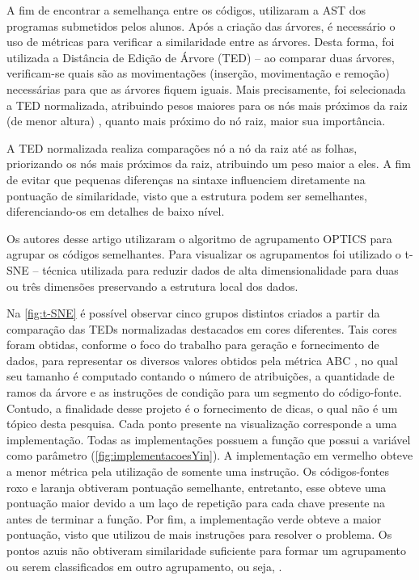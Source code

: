 		A fim de encontrar a semelhança entre os códigos, 
		utilizaram a AST dos programas submetidos pelos alunos. Após a criação das
		árvores, é necessário o uso de métricas para verificar a similaridade entre
		as árvores. Desta forma, foi utilizada a Distância de Edição de Árvore (\ac{TED})
		– ao comparar duas árvores, verificam-se quais são as movimentações (inserção,
		movimentação e remoção) necessárias para que as árvores fiquem iguais. Mais
		precisamente, foi selecionada a \acs{TED} normalizada, atribuindo pesos maiores para
		os nós mais próximos da raiz (de menor altura) \cite{zhang1989simple}, quanto
		mais próximo do nó raiz, maior sua importância.

		A \acs{TED} normalizada realiza comparações nó a nó da raiz até as folhas, priorizando
		os nós mais próximos da raiz, atribuindo um peso maior a eles. A fim de evitar
		que pequenas diferenças na sintaxe influenciem diretamente na pontuação de
		similaridade, visto que a estrutura podem ser semelhantes, diferenciando-os
		em detalhes de baixo nível.
		
		Os autores desse artigo utilizaram o algoritmo de agrupamento \ac{OPTICS}
		\cite{Ankerst1999} para agrupar os códigos semelhantes. Para visualizar os
		agrupamentos foi utilizado o \ac{t-SNE} \cite{maaten2008} – técnica utilizada para
		reduzir dados de alta dimensionalidade para duas ou três dimensões preservando
		a estrutura local dos dados.

		Na \cref{fig:t-SNE} é possível observar cinco grupos distintos criados a
		partir da comparação das \acs{TED}s normalizadas destacados em cores diferentes.
		Tais cores foram obtidas, conforme o foco do trabalho para geração e fornecimento
		de dados, para representar os diversos valores obtidos pela métrica ABC
		\cite{fitzpatrick1997applying}, no qual seu tamanho é computado contando o
		número de atribuições, a quantidade de ramos da árvore e as instruções de
		condição para um segmento do código-fonte. Contudo, a finalidade desse projeto é
		o fornecimento de dicas, o qual não é um tópico desta pesquisa. Cada ponto
		presente na visualização corresponde a uma implementação. Todas as
		implementações possuem a função  que possui a
		variável  como parâmetro (\cref{fig:implementacoesYin}). A
		implementação em vermelho obteve a menor métrica pela utilização de somente
		uma instrução. Os códigos-fontes roxo e laranja obtiveram pontuação semelhante,
		entretanto, esse obteve uma pontuação maior devido a um laço de repetição para
		cada chave presente na  antes de terminar a função. Por fim, a
		implementação verde obteve a maior pontuação, visto que utilizou de mais instruções
		para resolver o problema. Os pontos azuis não obtiveram similaridade
		suficiente para formar um agrupamento ou serem classificados em outro agrupamento,
		ou seja, .
		
